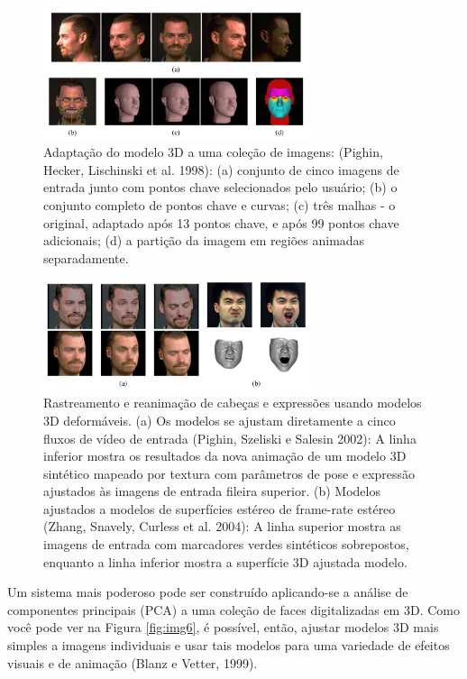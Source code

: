 \documentclass{article}
\begin{document}
\begin{figure}[!htb]
    \centering
    \includegraphics[width=0.7\textwidth]{img4.png}
    \caption{Adaptação do modelo 3D a uma coleção de imagens: (Pighin, Hecker, Lischinski et al. 1998): (a) conjunto de cinco imagens de entrada junto com pontos chave selecionados pelo usuário; (b) o conjunto completo de pontos chave e curvas; (c) três malhas - o original, adaptado após 13 pontos chave, e após 99 pontos chave adicionais; (d) a partição da imagem em regiões animadas separadamente.
}
    \label{fig:img4}
\end{figure}

\begin{figure}[!htb]
    \centering
    \includegraphics[width=0.7\textwidth]{img5.png}
    \caption{Rastreamento e reanimação de cabeças e expressões usando modelos 3D deformáveis. (a) Os modelos se ajustam diretamente a cinco fluxos de vídeo de entrada (Pighin, Szeliski e Salesin 2002): A linha inferior mostra os resultados da nova animação de um modelo 3D sintético mapeado por textura com parâmetros de pose e expressão ajustados às imagens de entrada fileira superior. (b) Modelos ajustados a modelos de superfícies estéreo de frame-rate estéreo (Zhang, Snavely, Curless et al. 2004): A linha superior mostra as imagens de entrada com marcadores verdes sintéticos sobrepostos, enquanto a linha inferior mostra a superfície 3D ajustada modelo.
}
    \label{fig:img5}
\end{figure}

Um sistema mais poderoso pode ser construído aplicando-se a análise de componentes principais (PCA) a uma coleção de faces digitalizadas em 3D. Como você pode ver na Figura \ref{fig:img6}, é possível, então, ajustar modelos 3D mais simples a imagens individuais e usar tais modelos para uma variedade de efeitos visuais e de animação (Blanz e Vetter, 1999)\cite{Blanz:1999:MMS:311535.311556}.
\end{document}
